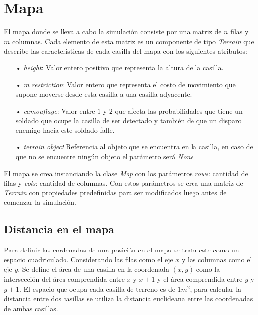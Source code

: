 \documentclass{llncs}
\begin{document}
%
\frontmatter          %
%
\pagestyle{headings}  %


\section{Mapa}

El mapa donde se lleva a cabo la simulaci\'on consiste por una matriz de $n$ filas y $m$ columnas. Cada elemento de esta matriz es un componente de tipo \emph{Terrain} que describe las caracter\'isticas de cada casilla del mapa con los siguientes atributos:\\

\begin{itemize}
\item[•] \emph{height}: Valor entero positivo que representa la altura de la casilla.
\item[•] \emph{m restriction}: Valor entero que representa el costo de movimiento que supone moverse desde esta casilla a una casilla adyacente.
\item[•] \emph{camouflage}: Valor entre $1$ y $2$ que afecta las probabilidades que tiene un soldado que ocupe la casilla de ser detectado y tambi\'en de que un disparo enemigo hacia este soldado falle.
\item[•] \emph{terrain object} Referencia al objeto que se encuentra en la casilla, en caso de que no se encuentre ning\'un objeto el par\'ametro ser\'a \emph{None}

\end{itemize}

El mapa se crea instanciando la clase \emph{Map} con los par\'ametros \emph{rows}: cantidad de filas y \emph{cols}: cantidad de columnas. Con estos par\'ametros se crea una matriz de \emph{Terrain} con propiedades predefinidas para ser modificados luego antes de comenzar la simulaci\'on.

\subsection{Distancia en el mapa}

Para definir las cordenadas de una posici\'on en el mapa se trata este como un espacio cuadriculado. Considerando las filas como el eje $x$ y las columnas como el eje $y$. Se define el \'area de una casilla en la coordenada $(x, y)$ como la intersecci\'on del \'area comprendida entre $x$ y $x+1$ y el \'area comprendida entre $y$ y $y+1$.
El espacio que ocupa cada casilla de terreno es de $1 m^2$, para calcular la distancia entre dos casillas se utiliza la distancia euclideana entre las coordenadas de ambas casillas.\\
\end{document}
